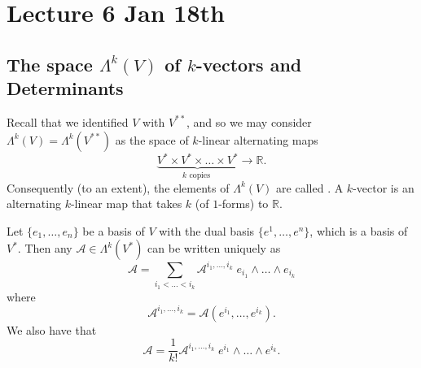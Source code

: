 \documentclass[notoc,notitlepage]{tufte-book}
\begin{document}



\chapter{Lecture 6 Jan 18th}%
\label{chp:lecture_6_jan_18th}

\section{The space \texorpdfstring{$\Lambda^k(V)$}{Lambda k(V)} of \texorpdfstring{$k$}{k}-vectors and Determinants}%
\label{sec:the_space_lambda_k_v_of_k_vectors_and_determinants}

Recall that we identified $V$ with $V^{**}$, and so we may consider
$\Lambda^k(V) = \Lambda^k(V^{**})$ as the space of $k$-linear alternating maps
\begin{equation*}
  \underbrace{V^* \times V^* \times \hdots \times V^*}_{k \text{ copies }} \to \mathbb{R}.
\end{equation*}
Consequently (to an extent), the elements of $\Lambda^k(V)$ are called .
A $k$-vector is an alternating $k$-linear map that takes $k$  (of $1$-forms)
to $\mathbb{R}$.

\begin{eg}
  Let $\{ e_1, \ldots, e_n \}$ be a basis of $V$ with the dual basis
  $\{ e^1, \ldots, e^n \}$, which is a basis of $V^*$. Then any 
  $\mathcal{A} \in \Lambda^k(V^*)$ can be written uniquely as
  \begin{equation*}
    \mathcal{A} = \sum_{i_1 < \hdots < i_k} \mathcal{A}^{i_1, \ldots, i_k} \;
      e_{i_1} \land \hdots \land e_{i_k}
  \end{equation*}
  where
  \begin{equation*}
    \mathcal{A}^{i_1, \ldots, i_k} = \mathcal{A} \left( e^{i_1}, \ldots, e^{i_k} \right).
  \end{equation*}
  We also have that
  \begin{equation*}
    \mathcal{A} = \frac{1}{k!} \mathcal{A}^{i_1, \ldots, i_k} \; e^{i_1} \land \hdots \land e^{i_k}.
  \end{equation*}
\end{eg}
\end{document}
